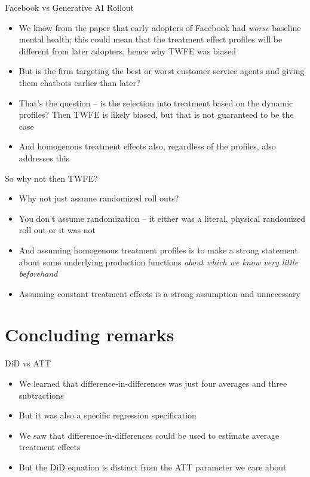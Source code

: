 \documentclass{beamer}
\begin{document}
\begin{frame}{Facebook vs Generative AI Rollout}

\begin{itemize}
\item We know from the paper that early adopters of Facebook had \emph{worse} baseline mental health; this could mean that the treatment effect profiles will be different from later adopters, hence why TWFE was biased
\item But is the firm targeting the best or worst customer service agents and giving them chatbots earlier than later?
\item That's the question -- is the selection into treatment based on the dynamic profiles? Then TWFE is likely biased, but that is not guaranteed to be the case
\item And homogenous treatment effects also, regardless of the profiles, also addresses this


\end{itemize}

\end{frame}


\begin{frame}{So why not then TWFE?}

\begin{itemize}
\item Why not just assume randomized roll outs? 
\item You don't assume randomization -- it either was a literal, physical randomized roll out or it was not
\item And assuming homogenous treatment profiles is to make a strong statement about some underlying production functions \emph{about which we know very little beforehand}
\item Assuming constant treatment effects is a strong assumption and unnecessary
\end{itemize}

\end{frame}
	



\section{Concluding remarks}



\begin{frame}{DiD vs ATT}

\begin{itemize}

\item We learned that difference-in-differences was just four averages and three subtractions
\item But it was also a specific regression specification
\item We saw that difference-in-differences could be used to estimate average treatment effects 
\item But the DiD equation is distinct from the ATT parameter we care about

\end{itemize}

\end{frame}
\end{document}
